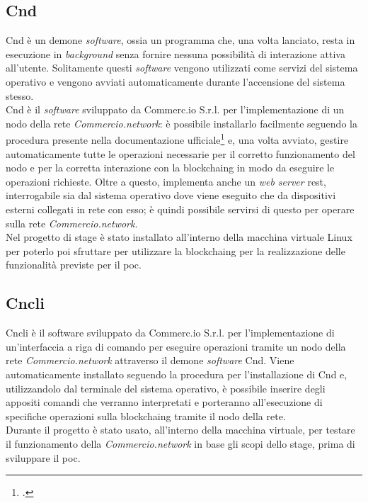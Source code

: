 \subsection{Cnd}

Cnd è un demone \textit{software}, ossia un programma che, una volta lanciato, resta in esecuzione in \textit{background} senza fornire nessuna possibilità di interazione attiva all'utente. Solitamente questi \textit{software} vengono utilizzati come servizi del sistema operativo e vengono avviati automaticamente durante l'accensione del sistema stesso.\\
Cnd è il \textit{software} sviluppato da Commerc.io S.r.l. per l'implementazione di un nodo della rete \textit{Commercio.network}: è possibile installarlo facilmente seguendo la procedura presente nella documentazione ufficiale\footcite{manual:docs-commercio-network} e, una volta avviato, gestire automaticamente tutte le operazioni necessarie per il corretto funzionamento del nodo e per la corretta interazione con la \gls{blockchaing} in modo da eseguire le operazioni richieste. Oltre a questo, implementa anche un \textit{web server} \gls{rest}\glsfirstoccur{}, interrogabile sia dal sistema operativo dove viene eseguito che da dispositivi esterni collegati in rete con esso; è quindi possibile servirsi di questo per operare sulla rete \textit{Commercio.network}.\\
Nel progetto di stage è stato installato all'interno della macchina virtuale Linux per poterlo poi sfruttare per utilizzare la \gls{blockchaing} per la realizzazione delle funzionalità previste per il \gls{poc}. 

\subsection{Cncli}

Cncli è il software sviluppato da Commerc.io S.r.l. per l'implementazione di un'interfaccia a riga di comando per eseguire operazioni tramite un nodo della rete \textit{Commercio.network} attraverso il demone \textit{software} Cnd. Viene automaticamente installato seguendo la procedura per l'installazione di Cnd e, utilizzandolo dal terminale del sistema operativo, è possibile inserire degli appositi comandi che verranno interpretati e porteranno all'esecuzione di specifiche operazioni sulla \gls{blockchaing} tramite il nodo della rete.\\
Durante il progetto è stato usato, all'interno della macchina virtuale, per testare il funzionamento della \textit{Commercio.network} in base gli scopi dello stage, prima di sviluppare il \gls{poc}. 

